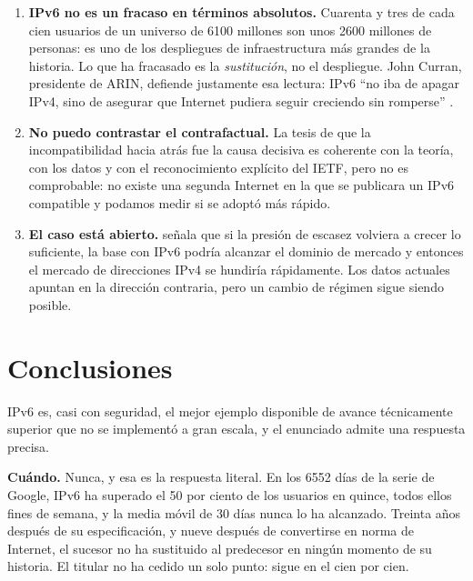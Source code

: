 \documentclass[11pt,letterpaper]{article}
\begin{document}
\begin{enumerate}
    serie continua del porcentaje de servidores migrados durante 1982 y 1983. La
    forma casi vertical de la curva refleja el hecho documentado de que la
    transición fue un cambio con fecha señalada \parencite{rfc801}, pero la
    pendiente exacta no está medida.
  \item \textbf{IPv6 no es un fracaso en términos absolutos.} Cuarenta y tres de
    cada cien usuarios de un universo de \num{6100} millones son unos
    \num{2600} millones de personas: es uno de los despliegues de infraestructura
    más grandes de la historia. Lo que ha fracasado es la \emph{sustitución}, no
    el despliegue. John Curran, presidente de ARIN, defiende justamente esa
    lectura: IPv6 \enquote{no iba de apagar IPv4, sino de asegurar que Internet
    pudiera seguir creciendo sin romperse} \parencite{register2025}.
  \item \textbf{No puedo contrastar el contrafactual.} La tesis de que la
    incompatibilidad hacia atrás fue la causa decisiva es coherente con la
    teoría, con los datos y con el reconocimiento explícito del IETF, pero no es
    comprobable: no existe una segunda Internet en la que se publicara un IPv6
    compatible y podamos medir si se adoptó más rápido.
  \item \textbf{El caso está abierto.} \textcite{huston2026a} señala que si la
    presión de escasez volviera a crecer lo suficiente, la base con IPv6 podría
    alcanzar el dominio de mercado y entonces el mercado de direcciones IPv4 se
    hundiría rápidamente. Los datos actuales apuntan en la dirección contraria,
    pero un cambio de régimen sigue siendo posible.
\end{enumerate}

\section*{Conclusiones}

IPv6 es, casi con seguridad, el mejor ejemplo disponible de avance técnicamente
superior que no se implementó a gran escala, y el enunciado admite una respuesta
precisa.

\textbf{Cuándo.} Nunca, y esa es la respuesta literal. En los \num{6552} días de
la serie de Google, IPv6 ha superado el 50 por ciento de los usuarios en quince,
todos ellos fines de semana, y la media móvil de 30 días nunca lo ha alcanzado.
Treinta años después de su especificación, y nueve después de convertirse en
norma de Internet, el sucesor no ha sustituido al predecesor en ningún momento
de su historia. El titular no ha cedido un solo punto: sigue en el cien por
cien.
\end{document}
